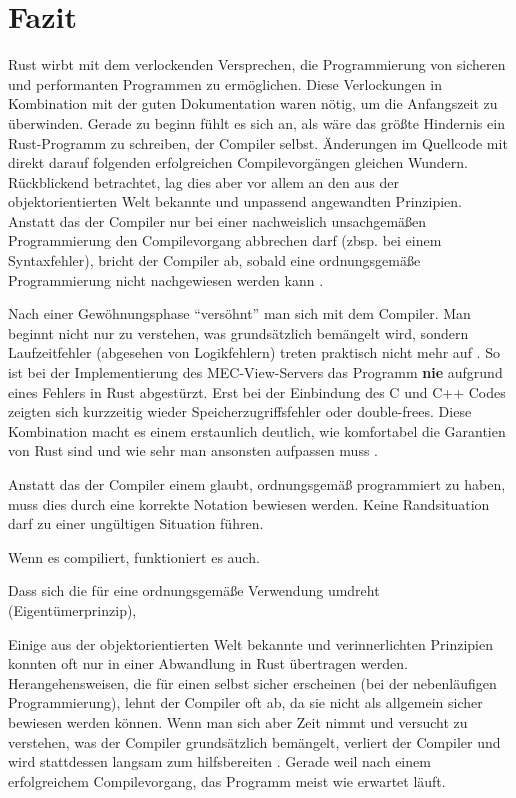 \chapter{Fazit}


Rust wirbt mit dem verlockenden Versprechen, die Programmierung von sicheren und performanten Programmen zu ermöglichen.
Diese Verlockungen in Kombination mit der guten Dokumentation waren nötig, um die Anfangszeit zu überwinden.
Gerade zu beginn fühlt es sich an, als wäre das größte Hindernis ein Rust-Programm zu schreiben, der Compiler selbst.
Änderungen im Quellcode mit direkt darauf folgenden erfolgreichen Compilevorgängen gleichen Wundern.
Rückblickend betrachtet, lag dies aber vor allem an den aus der objektorientierten Welt bekannte und unpassend angewandten Prinzipien.
Anstatt das der Compiler nur bei einer nachweislich unsachgemäßen Programmierung den Compilevorgang abbrechen darf (zbsp. bei einem Syntaxfehler), bricht der Compiler ab, sobald eine ordnungsgemäße Programmierung nicht nachgewiesen werden kann .

Nach einer Gewöhnungsphase \enquote{versöhnt} man sich mit dem Compiler.
Man beginnt nicht nur zu verstehen, was grundsätzlich bemängelt wird, sondern Laufzeitfehler (abgesehen von Logikfehlern) treten praktisch nicht mehr auf .
So ist bei der Implementierung des MEC-View-Servers das Programm \textbf{nie} aufgrund eines Fehlers in Rust abgestürzt.
Erst bei der Einbindung des C und C++ Codes zeigten sich kurzzeitig wieder Speicherzugriffsfehler oder double-frees.
Diese Kombination macht es einem erstaunlich deutlich, wie komfortabel die Garantien von Rust sind und wie sehr man ansonsten aufpassen muss .

Anstatt das der Compiler einem glaubt, ordnungsgemäß programmiert zu haben, muss dies durch eine korrekte Notation bewiesen werden.
Keine Randsituation darf zu einer ungültigen Situation führen.

Wenn es compiliert, funktioniert es auch.

Dass sich die  für eine ordnungsgemäße Verwendung umdreht (Eigentümerprinzip), 

Einige aus der objektorientierten Welt bekannte und verinnerlichten Prinzipien konnten oft nur in einer Abwandlung in Rust übertragen werden.
Herangehensweisen, die für einen selbst sicher erscheinen (bei der nebenläufigen Programmierung), lehnt der Compiler oft ab, da sie nicht als allgemein sicher bewiesen werden können.
Wenn man sich aber Zeit nimmt und versucht zu verstehen, was der Compiler grundsätzlich bemängelt, verliert der Compiler  und wird stattdessen langsam zum hilfsbereiten .
Gerade weil nach einem erfolgreichem Compilevorgang, das Programm meist wie erwartet läuft.


